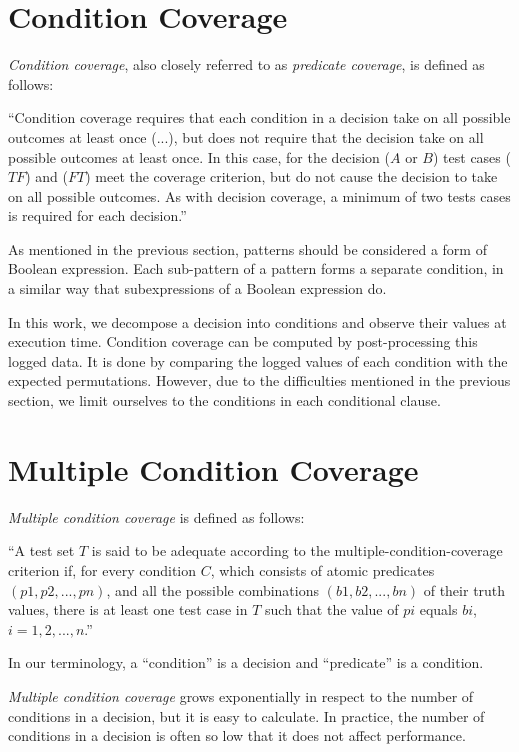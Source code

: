\documentclass[12pt,a4paper]{report}
\begin{document}
 
\section{Condition Coverage}
\emph{Condition coverage}, also closely referred to as \emph{predicate coverage}, is defined as follows:

``Condition coverage requires that each condition in a decision take on all possible outcomes at least once (...), but does not require that the decision take on all possible outcomes at least once. In this case, for the decision ($A$ or $B$) test cases ($TF$) and ($FT$) meet the coverage criterion, but do not cause the decision to take on all possible outcomes. As with decision coverage, a minimum of two tests cases is required for each decision.''\cite{KellyJ.:2001:PTM:886632}

As mentioned in the previous section, patterns should be considered a form of Boolean expression. Each sub-pattern of a pattern forms a separate condition, in a similar way that subexpressions of a Boolean expression do. 

In this work, we decompose a decision into conditions and observe their values at execution time. Condition coverage can be computed by post-processing this logged data. It is done by comparing the logged values of each condition with the expected permutations. However, due to the difficulties mentioned in the previous section, we limit ourselves to the conditions in each conditional clause. 

\section{Multiple Condition Coverage}
\emph{Multiple condition coverage} is defined as follows:

``A test set $T$ is said to be adequate according to the multiple-condition-coverage criterion if, for every condition $C$, which consists of atomic predicates $(p1, p2,  . . .  , pn)$, and all the possible combinations $(b1, b2,  . . .  , bn)$ of their truth values, there is at least one test case in $T$ such that the value of $pi$ equals $bi$, $i = 1, 2,  .  .  .  , n$.'' \cite{Zhu:1997:SUT:267580.267590}

In our terminology, a ``condition'' is a decision and ``predicate'' is a condition. 

\emph{Multiple condition coverage} grows exponentially in respect to the number of conditions in a decision, but it is easy to calculate. In practice, the number of conditions in a decision is often so low that it does not affect performance.
\end{document}

